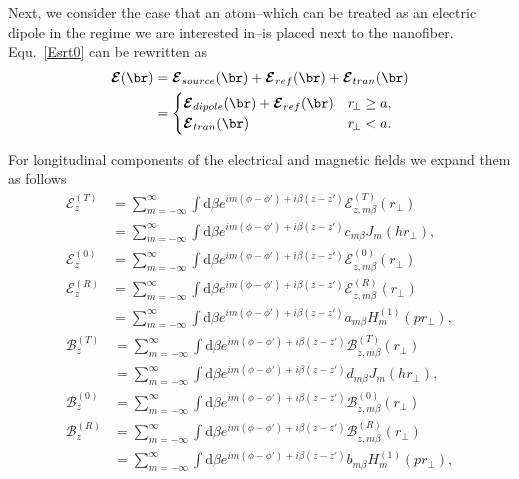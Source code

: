 \documentclass[]{report}
\begin{document}
Next, we consider the case that an atom--which can be treated as an electric dipole in the regime we are interested in--is placed next to the 
nanofiber. Equ.~\eqref{Esrt0} can be rewritten as 
\begin{align}
\boldsymbol{\mathcal{E}}(\br) &= \boldsymbol{\mathcal{E}}_{source}(\br) + 
\boldsymbol{\mathcal{E}}_{ref}(\br)+\boldsymbol{\mathcal{E}}_{tran}(\br)\\
&=
	\begin{cases}
	  \boldsymbol{\mathcal{E}}_{dipole} (\br)+ \boldsymbol{\mathcal{E}}_{ref}(\br) & r\!_\perp \geq a,\\
	  \boldsymbol{\mathcal{E}}_{tran}(\br) & r\!_\perp<a.
	\end{cases} \label{Etotalfiber}
\end{align}


For longitudinal components of the electrical and magnetic fields we expand them as follows
\begin{subequations}\label{ET0Rexpand}
\begin{align}
\mathcal{E}^{(T)}_z &= \sum_{m=-\infty}^\infty \int \mathrm{d}\beta e^{im(\phi-\phi') + i\beta (z-z')} \mathcal{E}^{(T)}_{z,m\beta}(r\!_\perp)\\
&= \sum_{m=-\infty}^\infty \int \mathrm{d}\beta e^{im(\phi-\phi') + i\beta (z-z')} c_{m\beta} J_m (hr\!_\perp),\\
\mathcal{E}^{(0)}_{z} &= \sum_{m=-\infty}^\infty \int \mathrm{d}\beta e^{im(\phi-\phi') + i\beta (z-z')} \mathcal{E}^{(0)}_{z,m\beta}(r\!_\perp)\\
\mathcal{E}^{(R)}_z &= \sum_{m=-\infty}^\infty \int \mathrm{d}\beta e^{im(\phi-\phi') + i\beta (z-z')} \mathcal{E}^{(R)}_{z,m\beta}(r\!_\perp)\\
&= \sum_{m=-\infty}^\infty \int \mathrm{d}\beta e^{im(\phi-\phi') + i\beta (z-z')} a_{m\beta} H_m^{(1)} (pr\!_\perp),
\end{align}
\end{subequations}
\begin{subequations}\label{BT0Rexpand}
\begin{align}
\mathcal{B}^{(T)}_z &= \sum_{m=-\infty}^\infty \int \mathrm{d}\beta e^{im(\phi-\phi') + i\beta (z-z')} \mathcal{B}^{(T)}_{z,m\beta}(r\!_\perp)\\
&= \sum_{m=-\infty}^\infty \int \mathrm{d}\beta e^{im(\phi-\phi') + i\beta (z-z')} d_{m\beta} J_m (hr\!_\perp),\\
\mathcal{B}^{(0)}_{z} &= \sum_{m=-\infty}^\infty \int \mathrm{d}\beta e^{im(\phi-\phi') + i\beta (z-z')} \mathcal{B}^{(0)}_{z,m\beta}(r\!_\perp)\\
\mathcal{B}^{(R)}_z &= \sum_{m=-\infty}^\infty \int \mathrm{d}\beta e^{im(\phi-\phi') + i\beta (z-z')} \mathcal{B}^{(R)}_{z,m\beta}(r\!_\perp)\\
&= \sum_{m=-\infty}^\infty \int \mathrm{d}\beta e^{im(\phi-\phi') + i\beta (z-z')} b_{m\beta} H_m^{(1)} (pr\!_\perp),
\end{align}
\end{subequations}
\end{document}
